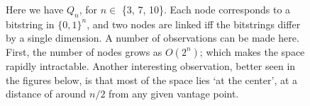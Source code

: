 \begin{figure}[p!]
  \centering

  \caption{Here we have $Q_n$, for $n \in$ \{3, 7, 10\}. Each node corresponds to a bitstring in $\{0,1\}^n$, and two nodes are linked iff the bitstrings differ by a single dimension.  A number of observations can be made here. First, the number of nodes grows as $O(2^n)$; which makes the space rapidly intractable. Another interesting observation, better seen in the figures below, is that most of the space lies `at the center', at a distance of around $n/2$ from any given vantage point.\label{hypercubes}}
\end{figure}

